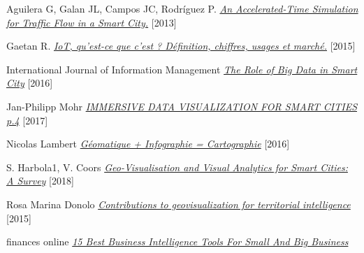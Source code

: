 \documentclass[french, a4paper, 12pt]{report}
\begin{document}
\begin{thebibliography}{9}
Aguilera G, Galan JL, Campos JC, Rodríguez P. \href{}{\emph{An Accelerated-Time Simulation for Traffic Flow in a Smart City.}} [2013]

Gaetan R. \href{https://www.objetconnecte.com/iot-definition-chiffres-usages-marches/}{\emph{IoT, qu’est-ce que c’est ? Définition, chiffres, usages et marché.}} [2015]


International Journal of Information Management \href{https://www.researchgate.net/publication/301803005_The_Role_of_Big_Data_in_Smart_City}{\emph{The Role of Big Data in Smart City}} [2016]

 Jan-Philipp Mohr \href{https://hashplay.net/wp-content/uploads/2017/11/HASHPLAY-Smart-City-whitepaper-v2.pdf}{\emph{IMMERSIVE DATA VISUALIZATION
FOR SMART CITIES p.4}} [2017]


 Nicolas Lambert \href{https://neocarto.hypotheses.org/2068}{\emph{Géomatique + Infographie = Cartographie}} [2016]

 S. Harbola1, V. Coors \href{https://www.researchgate.net/publication/327785603_GEO-VISUALISATION_AND_VISUAL_ANALYTICS_FOR_SMART_CITIES_A_SURVEY}{\emph{Geo-Visualisation and Visual Analytics for Smart Cities: A Survey}} [2018]

 Rosa Marina Donolo \href{http://theses.insa-lyon.fr/publication/2014ISAL0075/these.pdf}{\emph{Contributions to geovisualization for territorial intelligence}} [2015]

 finances online \href{https://financesonline.com/15-best-business-intelligence-tools-small-big-business/#looker}{\emph{15 Best Business Intelligence Tools For Small And Big Business}}

\end{thebibliography}
\end{document}
